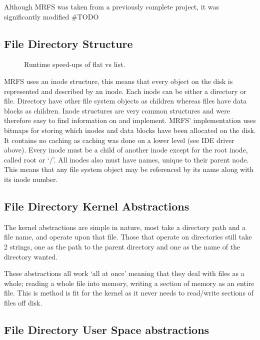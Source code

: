 \documentclass[a4paper]{report}
\begin{document}
Although MRFS was taken from a previously complete project, it was significantly modified #TODO

\subsection{File Directory Structure}

\begin{figure}[ht]
  \centering

  \def\svgwidth{\columnwidth}
  \caption{Runtime speed-ups of flat vs list.}
  \label{fig:schedulerscreen}
\end{figure}

MRFS uses an inode structure, this means that every object on the disk is represented and described by an inode. Each inode can be either a directory or file. Directory have other file system objects as children whereas files have data blocks as children. Inode structures are very common structures and were therefore easy to find information on and implement. MRFS' implementation uses bitmaps for storing which inodes and data blocks have been allocated on the disk. It contains no caching as caching was done on a lower level (see IDE driver above). Every inode must be a child of another inode except for the root inode, called root or `/'. All inodes also must have names, unique to their parent node. This means that any file system object may be referenced by its name along with its inode number.

\subsection{File Directory Kernel Abstractions}

The kernel abstractions are simple in nature, most take a directory path and a file name, and operate upon that file. Those that operate on directories still take 2 strings, one as the path to the parent directory and one as the name of the directory wanted.

These abstractions all work `all at once' meaning that they deal with files as a whole; reading a whole file into memory, writing a section of memory as an entire file. This is method is fit for the kernel as it never needs to read/write sections of files off disk.

\subsection{File Directory User Space abstractions}
\end{document}
